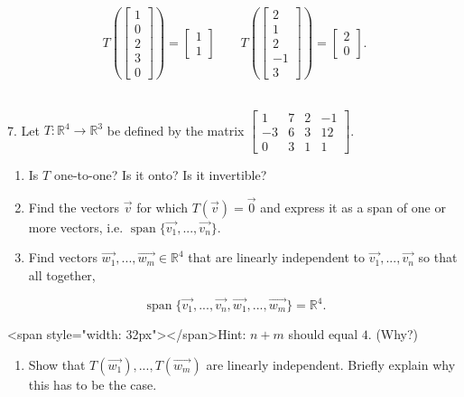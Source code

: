 \documentclass{article}
\begin{document}
$$
	T\left(\left[\begin{array}{c} 1 \\ 0 \\ 2 \\ 3 \\ 0 \end{array}\right]\right) = \left[\begin{array}{c} 1 \\ 1 \end{array}\right] \qquad T\left(\left[\begin{array}{c} 2 \\ 1 \\ 2 \\ -1 \\ 3 \end{array}\right]\right) = \left[\begin{array}{c} 2 \\ 0 \end{array}\right].
$$

~\\

7. Let $T : \mathbb{R}^4 \to \mathbb{R}^3$ be defined by the matrix $\left[\begin{array}{cccc} 1& 7& 2& -1 \\ -3& 6& 3& 12 \\ 0& 3& 1& 1 \end{array}\right]$.

\begin{enumerate}

	\item Is $T$ one-to-one? Is it onto? Is it invertible?

	\item Find the vectors $\vec{v}$ for which $T(\vec{v}) = \vec{0}$ and express it as a span of one or more vectors, i.e. $\operatorname{span}\{ \vec{v_1}, ..., \vec{v_n} \}$.

	\item Find vectors $\vec{w_1}, ..., \vec{w_m} \in \mathbb{R}^4$ that are linearly independent to $\vec{v_1}, ..., \vec{v_n}$ so that all together,

\end{enumerate}

$$
	\operatorname{span}\{ \vec{v_1}, ..., \vec{v_n}, \vec{w_1}, ..., \vec{w_m} \} = \mathbb{R}^4.
$$

<span style="width: 32px"></span>Hint: $n + m$ should equal $4$. (Why?)

\begin{enumerate}

	\item Show that $T(\vec{w_1}), ..., T(\vec{w_m})$ are linearly independent. Briefly explain why this has to be the case.

\end{enumerate}
\end{document}
